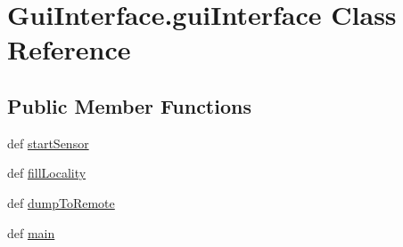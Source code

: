\hypertarget{class_gui_interface_1_1gui_interface}{\section{Gui\-Interface.\-gui\-Interface Class Reference}
\label{class_gui_interface_1_1gui_interface}
}
\subsection*{Public Member Functions}
\begin{DoxyCompactItemize}
\item 
def \hyperlink{class_gui_interface_1_1gui_interface_ac54648b04404d73cdf5cc648cd0df814}{start\-Sensor}
\item 
def \hyperlink{class_gui_interface_1_1gui_interface_a87f803203fddf02263f7edf07e47097a}{fill\-Locality}
\item 
def \hyperlink{class_gui_interface_1_1gui_interface_a64d4c8bc5d86f421303bddf0d12d18f3}{dump\-To\-Remote}
\item 
def \hyperlink{class_gui_interface_1_1gui_interface_a57f43b82011bb65e63628118e023b748}{main}
\end{DoxyCompactItemize}


